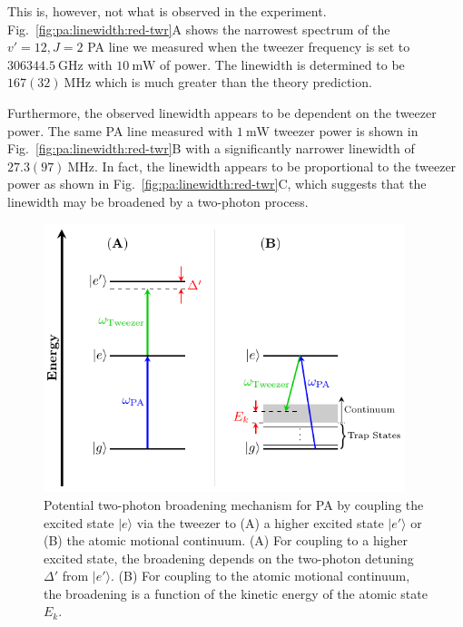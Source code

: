 This is, however, not what is observed in the experiment.
Fig.~\ref{fig:pa:linewidth:red-twr}A shows the narrowest spectrum of the $v'=12, J=2$ PA line
we measured when the tweezer frequency is set to $306344.5~\mathrm{GHz}$
with $10~\mathrm{mW}$ of power. The linewidth is determined to be $167(32)~\mathrm{MHz}$
which is much greater than the theory prediction.

Furthermore, the observed linewidth appears to be dependent on the tweezer power.
The same PA line measured with $1~\mathrm{mW}$ tweezer power
is shown in Fig.~\ref{fig:pa:linewidth:red-twr}B with a significantly narrower linewidth
of $27.3(97)~\mathrm{MHz}$.
In fact, the linewidth appears to be proportional to the tweezer power
as shown in Fig.~\ref{fig:pa:linewidth:red-twr}C,
which suggests that the linewidth may be broadened by a two-photon process.

\begin{figure}
  \centering
  \includegraphics[width=0.939\textwidth]{figures/pa_two_photon_up_vs_down.pdf}
  \caption[Two-photon broadening mechanism for PA.]{
    Potential two-photon broadening mechanism for PA by coupling the excited state $|e\rangle$
    via the tweezer to (A) a higher excited state $|e'\rangle$ or
    (B) the atomic motional continuum.
    (A) For coupling to a higher excited state,
    the broadening depends on the two-photon detuning $\Delta'$ from $|e'\rangle$.
    (B) For coupling to the atomic motional continuum,
    the broadening is a function of the kinetic energy of the atomic state $E_k$.
    \label{fig:pa:linewidth:up-vs-down}}
\end{figure}

